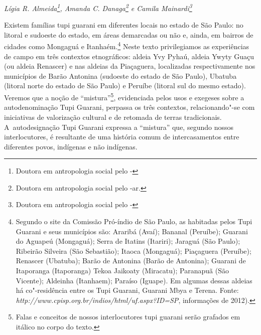 
\begin{flushright}
\emph{Lígia R. Almeida\footnote{Doutora em antropologia social pelo
-}, Amanda C. Danaga\footnote{Doutora em antropologia
social pelo -ar.} e Camila Mainardi\footnote{Doutora em antropologia social pelo -}}
\end{flushright}
\medskip
%

\noindent
Existem famílias tupi guarani em diferentes locais no estado de São
Paulo: no litoral e sudoeste do estado, em áreas demarcadas ou não e,
ainda, em bairros de cidades como Mongaguá e Itanhaém.\footnote{Segundo
o site da Comissão Pró-índio de São Paulo, as  habitadas pelos Tupi
Guarani e seus municípios são: Araribá (Avaí); Bananal (Peruíbe);
Guarani do Aguapeú (Mongaguá); Serra de Itatins (Itariri); Jaraguá (São
Paulo); Ribeirão Silveira (São Sebastião); Itaoca (Mongaguá);
Piaçaguera (Peruíbe); Renascer (Ubatuba); Barão de Antonina (Barão de
Antonina); Guarani de Itaporanga (Itaporanga) Tekoa Jaikoaty
(Miracatu); Paranapuã (São Vicente); Aldeinha (Itanhaem); Paraíso
(Iguape). Em algumas dessas aldeias há co"-residência entre os Tupi
Guarani, Guarani Mbya e Terena. Fonte: \emph{http://www.cpisp.org.br/indios/html/uf.aspx?ID=SP}, informações de
2012).} Neste texto privilegiamos as experiências de campo em três
contextos etnográficos: aldeia Yvy Pyhaú, aldeia Ywyty Guaçu (ou aldeia
Renascer) e nas aldeias da  Piaçaguera, localizadas respectivamente
nos municípios de Barão Antonina (sudoeste do estado de São Paulo),
Ubatuba (litoral norte do estado de São Paulo) e Peruíbe (litoral sul
do mesmo estado). Veremos que a noção de ``mistura''\footnote{Falas e
conceitos de nossos interlocutores tupi guarani serão grafados em
itálico no corpo do texto.}, evidenciada pelos usos e exegeses sobre a
autodenominação Tupi Guarani, perpassa os três contextos,
relacionando"-se com iniciativas de valorização cultural e de retomada
de terras tradicionais. A~autodesignação Tupi Guarani expressa a
``mistura'' que, segundo nossos interlocutores, é resultante de uma história
comum de intercasamentos entre diferentes povos, indígenas e não
indígenas. 

